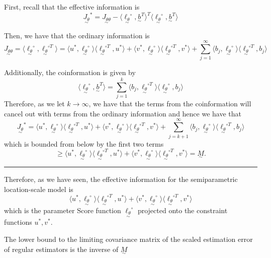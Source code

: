 \documentclass[twoside]{article}
\newenvironment{proof}{{\bf Proof:}}{\hfill\rule{2mm}{2mm}}
\newcommand{\utilde}{\underset{\sim}}
\begin{document}
\begin{proof}
First, recall that the effective information is 
$$
\utilde{J_{\theta}}^{*} = \utilde{J_{\theta \theta}} - \langle \utilde{\ell_{\theta}}^{\circ}, \utilde{b}^{T} \rangle^T \langle \utilde{\ell_{\theta}}^{\circ}, \utilde{b}^{T} \rangle
$$

Then, we have that the ordinary information is 
$$
\utilde{J_{\theta \theta}} = \langle \utilde{\ell_{\theta}}^{\circ}, \utilde{\ell_{\theta}}^{\circ T} \rangle = \langle u^*, \utilde{\ell_{\theta}}^{\circ}\rangle \langle \utilde{\ell_{\theta}}^{\circ T}, u^*\rangle + \langle v^*, \utilde{\ell_{\theta}}^{\circ}\rangle \langle \utilde{\ell_{\theta}}^{\circ T}, v^* \rangle + \sum_{j=1}^{\infty}\langle b_j, \utilde{\ell_{\theta}}^{\circ} \rangle \langle \utilde{\ell_{\theta}}^{\circ T}, b_j \rangle 
$$

Additionally, the coinformation is given by 
$$
\langle \utilde{\ell_{\theta}}^{\circ}, \utilde{b}^{T} \rangle = \sum_{j=1}^{k}\langle b_j, \utilde{\ell_{\theta}}^{\circ T} \rangle \langle \utilde{\ell_{\theta}}^{\circ}, b_j \rangle
$$
Therefore, as we let $k \rightarrow \infty$, we have that the terms from the coinformation will cancel out with terms from the ordinary information and hence we have that 
$$
\utilde{J_{\theta}}^{*} = \langle u^*, \utilde{\ell_{\theta}}^{\circ}\rangle \langle \utilde{\ell_{\theta}}^{\circ T}, u^*\rangle + \langle v^*, \utilde{\ell_{\theta}}^{\circ}\rangle \langle \utilde{\ell_{\theta}}^{\circ T}, v^* \rangle + \sum_{j=k+1}^{\infty}\langle b_j, \utilde{\ell_{\theta}}^{\circ} \rangle \langle \utilde{\ell_{\theta}}^{\circ T}, b_j \rangle 
$$
which is bounded from below by the first two terms 
$$
\geq \langle u^*, \utilde{\ell_{\theta}}^{\circ}\rangle \langle \utilde{\ell_{\theta}}^{\circ T}, u^*\rangle + \langle v^*, \utilde{\ell_{\theta}}^{\circ}\rangle \langle \utilde{\ell_{\theta}}^{\circ T}, v^* \rangle = \utilde{M}.
$$
\end{proof}

Therefore, as we have seen, the effective information for the semiparametric location-scale model is 
$$
\langle u^*, \utilde{\ell_{\theta}}^{\circ}\rangle \langle \utilde{\ell_{\theta}}^{\circ T}, u^*\rangle + \langle v^*, \utilde{\ell_{\theta}}^{\circ}\rangle \langle \utilde{\ell_{\theta}}^{\circ T}, v^* \rangle 
$$
which is the parameter Score function $\utilde{\ell_{\theta}}^{\circ}$ projected onto the constraint functions $u^*, v^*.$


The lower bound to the limiting covariance matrix of the scaled estimation error of regular estimators is the inverse of $\utilde{M}$ 
\end{document}
